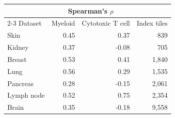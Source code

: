 \begin{tabular}{lrrr}
\toprule
 & \multicolumn{2}{c}{Spearman's $\rho$} &  \\
\cmidrule(lr){2-3}
Dataset & Myeloid & Cytotoxic T cell & Index tiles \\
\midrule
Skin & 0.45 & 0.37 & 839 \\
Kidney & 0.37 & -0.08 & 705 \\
Breast & 0.53 & 0.41 & 1{,}840 \\
Lung & 0.56 & 0.29 & 1{,}535 \\
Pancreas & 0.28 & -0.15 & 2{,}061 \\
Lymph node & 0.52 & 0.75 & 2{,}354 \\
Brain & 0.35 & -0.18 & 9{,}558 \\
\bottomrule
\end{tabular}
